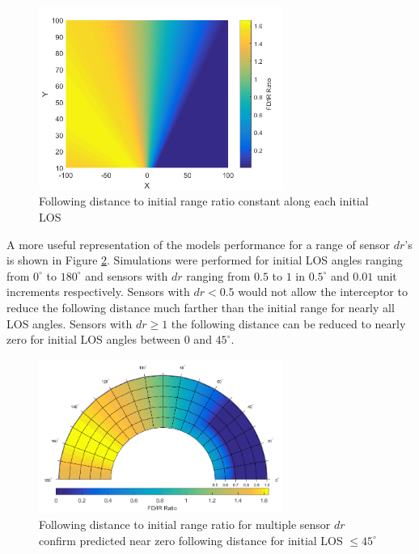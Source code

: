 \documentclass[conference]{IEEEtran}
\begin{document}




\begin{figure}[H]
	\centering
	\includegraphics[width=8cm]{FDIR_Rays.png}
	\caption{Following distance to initial range ratio constant along each initial LOS}
	\label{fig:Rays}
\end{figure}

A more useful representation of the models performance for a range of sensor $dr$'s is shown in Figure \ref{fig:Polar}. Simulations were performed for initial LOS angles ranging from $0^{\circ}$ to $180^{\circ}$ and sensors with $dr$ ranging from $0.5$ to $1$ in $0.5^{\circ}$ and $0.01$ unit increments respectively. Sensors with $dr < 0.5$ would not allow the interceptor to reduce the following distance much farther than the initial range for nearly all LOS angles. Sensors with $dr \geq 1$ the following distance can be reduced to nearly zero for initial LOS angles between $0$ and $45^{\circ}$. 

\begin{figure}[H]
	\centering
	\includegraphics[width=8cm]{correctpolar.png}
	\caption{Following distance to initial range ratio for multiple sensor $dr$ confirm predicted near zero following distance for initial LOS $\leq45^\circ$}
	\label{fig:Polar}
\end{figure}
\end{document}
